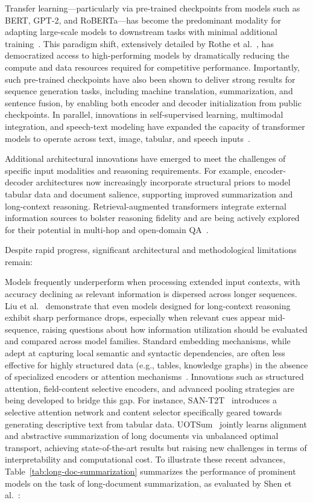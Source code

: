 \documentclass[sigconf]{acmart}
\begin{document}
Transfer learning---particularly via pre-trained checkpoints from models such as BERT, GPT-2, and RoBERTa---has become the predominant modality for adapting large-scale models to downstream tasks with minimal additional training~\cite{ref100}. This paradigm shift, extensively detailed by Rothe et al.~\cite{ref100}, has democratized access to high-performing models by dramatically reducing the compute and data resources required for competitive performance. Importantly, such pre-trained checkpoints have also been shown to deliver strong results for sequence generation tasks, including machine translation, summarization, and sentence fusion, by enabling both encoder and decoder initialization from public checkpoints. In parallel, innovations in self-supervised learning, multimodal integration, and speech-text modeling have expanded the capacity of transformer models to operate across text, image, tabular, and speech inputs~\cite{ref72,ref77}.

Additional architectural innovations have emerged to meet the challenges of specific input modalities and reasoning requirements. For example, encoder-decoder architectures now increasingly incorporate structural priors to model tabular data and document salience, supporting improved summarization and long-context reasoning. Retrieval-augmented transformers integrate external information sources to bolster reasoning fidelity and are being actively explored for their potential in multi-hop and open-domain QA~\cite{ref75,ref77,ref100}. 

Despite rapid progress, significant architectural and methodological limitations remain:

Models frequently underperform when processing extended input contexts, with accuracy declining as relevant information is dispersed across longer sequences. Liu et al.~\cite{ref70} demonstrate that even models designed for long-context reasoning exhibit sharp performance drops, especially when relevant cues appear mid-sequence, raising questions about how information utilization should be evaluated and compared across model families.
Standard embedding mechanisms, while adept at capturing local semantic and syntactic dependencies, are often less effective for highly structured data (e.g., tables, knowledge graphs) in the absence of specialized encoders or attention mechanisms~\cite{ref74,ref77,ref100}.
Innovations such as structured attention, field-content selective encoders, and advanced pooling strategies are being developed to bridge this gap. For instance, SAN-T2T~\cite{ref74} introduces a selective attention network and content selector specifically geared towards generating descriptive text from tabular data. UOTSum~\cite{ref75} jointly learns alignment and abstractive summarization of long documents via unbalanced optimal transport, achieving state-of-the-art results but raising new challenges in terms of interpretability and computational cost.
To illustrate these recent advances, Table~\ref{tab:long-doc-summarization} summarizes the performance of prominent models on the task of long-document summarization, as evaluated by Shen et al.~\cite{ref75}:
\end{document}

